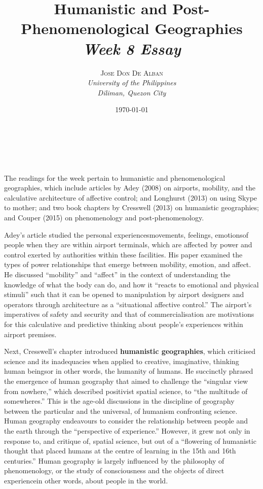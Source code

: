 \documentclass[a4paper, 10.5pt]{article} %
\title{\textbf{Humanistic and Post-Phenomenological Geographies}\\ %
\textsl{Week 8 Essay}} %
\author{\textsc{Jose Don De Alban} %
\\{\textit{University of the Philippines} %
\\{\textit{Diliman, Quezon City}}}} %
\date{\today} %
\makeatletter
\renewcommand{\maketitle}
{
\begin{flushright} %
{\LARGE\@title} %
\vspace{40pt} %

{\large\@author} %
\\\@date %

\vspace{10pt} %
\end{flushright}
}
\makeatother
\begin{document}
\maketitle %


\section*{}

The readings for the week pertain to humanistic and phenomenological geographies, which include articles by Adey (2008) \cite{adey_2008} on airports, mobility, and the calculative architecture of affective control; and Longhurst (2013) \cite{longhurst_2013} on using Skype to mother; and two book chapters by Cresswell (2013) \cite{cresswell_2013} on humanistic geographies; and Couper (2015) \cite{couper_2015} on phenomenology and post-phenomenology.

Adey's article studied the personal experiences\textemdash{}movements, feelings, emotions\textemdash{}of people when they are within airport terminals, which are affected by power and control exerted by authorities within these facilities. His paper examined the types of power relationships that emerge between mobility, emotion, and affect. He discussed \enquote{mobility} and \enquote{affect} in the context of understanding the knowledge of what the body can do, and how it \enquote{reacts to emotional and physical stimuli} such that it can be opened to manipulation by airport designers and operators through architecture as a \enquote{situational affective control.} The airport's imperatives of safety and security and that of commercialisation are motivations for this calculative and predictive thinking about people's experiences within airport premises.

Next, Cresswell's chapter introduced \textbf{humanistic geographies}, which criticised science and its inadequacies when applied to creative, imaginative, thinking human beings\textemdash{}or in other words, the humanity of humans. He succinctly phrased the emergence of human geography that aimed to challenge the \enquote{singular view from nowhere,} which described positivist spatial science, to \enquote{the multitude of somewheres.} This is the age-old discussions in the discipline of geography between the particular and the universal, of humanism confronting science. Human geography endeavours to consider the relationship between people and the earth through the \enquote{perspective of experience.} However, it grew not only in response to, and critique of, spatial science, but out of a \enquote{flowering of humanistic thought that placed humans at the centre of learning in the 15th and 16th centuries.} Human geography is largely influenced by the philosophy of phenomenology, or the study of consciousness and the objects of direct experience\textemdash{}in other words, about people in the world.
\end{document}
